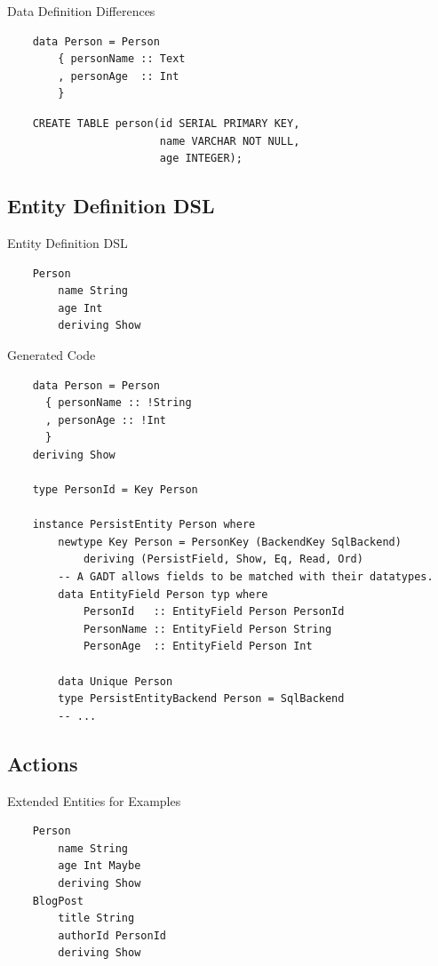 \documentclass[pdf]{beamer}
\begin{document}
\begin{frame}[fragile]{Data Definition Differences}
  \begin{verbatim}
    data Person = Person
        { personName :: Text
        , personAge  :: Int
        }
  \end{verbatim}
  \pause
  \begin{verbatim}
    CREATE TABLE person(id SERIAL PRIMARY KEY,
                        name VARCHAR NOT NULL,
                        age INTEGER);
  \end{verbatim}
\end{frame}

\subsection{Entity Definition DSL}
\begin{frame}[fragile]{Entity Definition DSL}
  \begin{verbatim}
    Person
        name String
        age Int
        deriving Show
  \end{verbatim}
\end{frame}

\begin{frame}[fragile]{Generated Code}
  \begin{verbatim}
    data Person = Person
      { personName :: !String
      , personAge :: !Int
      }
    deriving Show

    type PersonId = Key Person

    instance PersistEntity Person where
        newtype Key Person = PersonKey (BackendKey SqlBackend)
            deriving (PersistField, Show, Eq, Read, Ord)
        -- A GADT allows fields to be matched with their datatypes.
        data EntityField Person typ where
            PersonId   :: EntityField Person PersonId
            PersonName :: EntityField Person String
            PersonAge  :: EntityField Person Int

        data Unique Person
        type PersistEntityBackend Person = SqlBackend
        -- ...
  \end{verbatim}
\end{frame}

\subsection{Actions}
\begin{frame}[fragile]{Extended Entities for Examples}
  \begin{verbatim}
    Person
        name String
        age Int Maybe
        deriving Show
    BlogPost
        title String
        authorId PersonId
        deriving Show
  \end{verbatim}
\end{frame}
\end{document}
